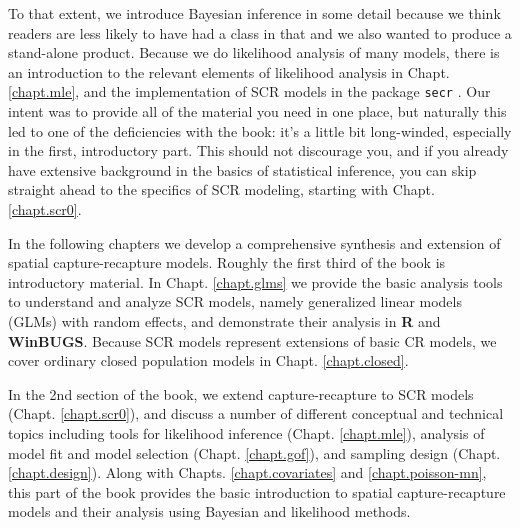 To that extent, we introduce Bayesian inference in some detail because
we think readers are less likely to have had a class in that and we
also wanted to produce a stand-alone product.  Because we do
likelihood analysis of many models, there is an introduction to the
relevant elements of likelihood analysis in Chapt. \ref{chapt.mle},
and the implementation of SCR models in the package \mbox{\tt secr}
\citep{efford:2011}.  
Our intent was to provide all of the
material you need in one place, but naturally this led to one of the
deficiencies with the book: it's a little bit long-winded, especially in the first, introductory part.
This should not discourage you, and if you already have extensive
background in the basics of statistical inference, you can skip
straight ahead to the specifics of SCR modeling, starting with Chapt. \ref{chapt.scr0}.

In the following chapters we develop a comprehensive synthesis and
extension of spatial capture-recapture models.  Roughly the first
third of the book is introductory material. In Chapt. \ref{chapt.glms}
we provide the basic analysis tools to understand and analyze SCR
models, namely generalized linear models (GLMs) with random effects,
and demonstrate their analysis in {\bf R} and {\bf WinBUGS}.  
Because SCR models
represent extensions of basic
CR models, we cover
ordinary closed population models in Chapt. \ref{chapt.closed}.


In the 2nd section of the book, we extend
capture-recapture to SCR models
(Chapt. \ref{chapt.scr0}),
 and discuss a number of different
conceptual and technical topics including tools for likelihood
inference (Chapt. \ref{chapt.mle}), analysis of model fit and model
selection (Chapt. \ref{chapt.gof}), and sampling design
(Chapt. \ref{chapt.design}).
Along with 
Chapts. 
 \ref{chapt.covariates}
and \ref{chapt.poisson-mn}, this part of the book provides the basic
introduction to 
spatial capture-recapture models and their analysis using Bayesian and
likelihood methods.

